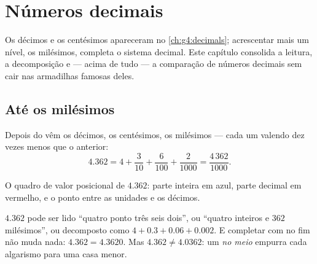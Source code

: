 \chapter{Números decimais}\label{ch:g5:decimals}

Os décimos e os centésimos apareceram no \cref{ch:g4:decimals};
acrescentar mais um nível, os milésimos, completa o sistema decimal.
Este capítulo consolida a leitura, a decomposição e --- acima de tudo
--- a comparação de números decimais sem cair nas armadilhas famosas
deles.

\section{Até os milésimos}

\begin{definition}\label{def:g5:decimals:places}
Depois do  vêm os décimos, os centésimos, os milésimos
--- cada um valendo dez vezes menos que o anterior:
\[
4.362 = 4 + \frac{3}{10} + \frac{6}{100} + \frac{2}{1000}
= \frac{4\,362}{1000}.
\]
\end{definition}

\begin{omfigure}

{\small O quadro de valor posicional de $4.362$: parte inteira em
azul, parte decimal em vermelho, e o ponto entre as unidades e os
décimos.}
\end{omfigure}

\begin{example}\label{ex:g5:decimals:readings}
$4.362$ pode ser lido ``quatro ponto três seis dois'', ou ``quatro
inteiros e $362$ milésimos'', ou decomposto como
$4 + 0.3 + 0.06 + 0.002$. E completar com  no fim não muda nada:
$4.362 = 4.3620$. Mas $4.362 \neq 4.0362$: um  \emph{no meio}
empurra cada algarismo para uma casa menor.
\end{example}

